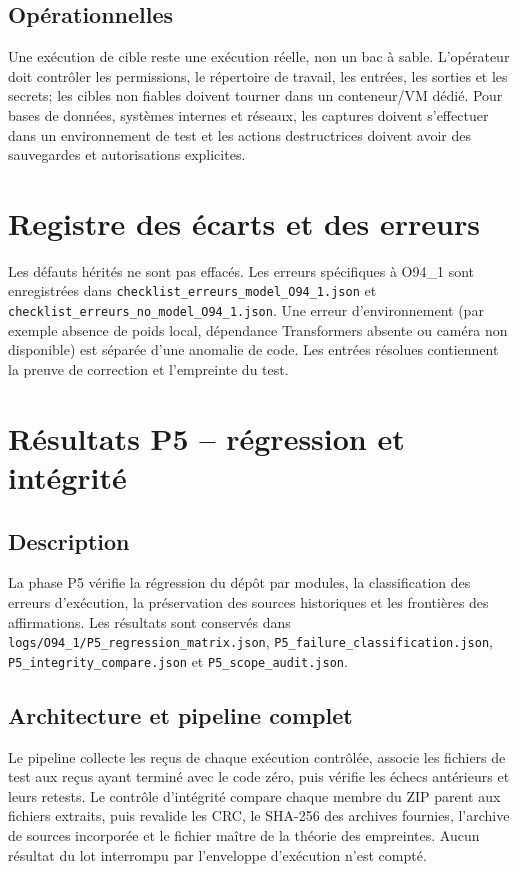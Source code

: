 \documentclass[11pt,a4paper]{article}
\begin{document}
\subsection{Opérationnelles}
Une exécution de cible reste une exécution réelle, non un bac à sable. L'opérateur doit contrôler les permissions, le répertoire de travail, les entrées, les sorties et les secrets; les cibles non fiables doivent tourner dans un conteneur/VM dédié. Pour bases de données, systèmes internes et réseaux, les captures doivent s'effectuer dans un environnement de test et les actions destructrices doivent avoir des sauvegardes et autorisations explicites.

\section{Registre des écarts et des erreurs}
Les défauts hérités ne sont pas effacés. Les erreurs spécifiques à O94\_1 sont enregistrées dans \texttt{checklist\_erreurs\_model\_O94\_1.json} et \texttt{checklist\_erreurs\_no\_model\_O94\_1.json}. Une erreur d'environnement (par exemple absence de poids local, dépendance Transformers absente ou caméra non disponible) est séparée d'une anomalie de code. Les entrées résolues contiennent la preuve de correction et l'empreinte du test.

\section{Résultats P5 -- régression et intégrité}
\subsection{Description}
La phase P5 vérifie la régression du dépôt par modules, la classification des erreurs d'exécution, la préservation des sources historiques et les frontières des affirmations. Les résultats sont conservés dans \texttt{logs/O94\_1/P5\_regression\_matrix.json}, \texttt{P5\_failure\_classification.json}, \texttt{P5\_integrity\_compare.json} et \texttt{P5\_scope\_audit.json}.

\subsection{Architecture et pipeline complet}
Le pipeline collecte les reçus de chaque exécution contrôlée, associe les fichiers de test aux reçus ayant terminé avec le code zéro, puis vérifie les échecs antérieurs et leurs retests. Le contrôle d'intégrité compare chaque membre du ZIP parent aux fichiers extraits, puis revalide les CRC, le SHA-256 des archives fournies, l'archive de sources incorporée et le fichier maître de la théorie des empreintes. Aucun résultat du lot interrompu par l'enveloppe d'exécution n'est compté.
\end{document}
